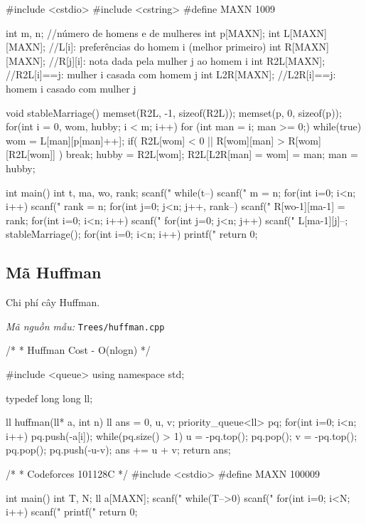 \documentclass[11pt]{article}
\newcommand{\codepath}[1]{\par\noindent\textit{Mã nguồn mẫu:} \texttt{#1}\par}
\begin{document}
\begingroup\scriptsize
\begin{vncode}
#include <cstdio>
#include <cstring>
#define MAXN 1009

int m, n;     //número de homens e de mulheres
int p[MAXN];
int L[MAXN][MAXN];    //L[i]: preferências do homem i (melhor primeiro)
int R[MAXN][MAXN];    //R[j][i]: nota dada pela mulher j ao homem i
int R2L[MAXN];  //R2L[i]==j: mulher i casada com homem j 
int L2R[MAXN];  //L2R[i]==j: homem i casado com mulher j 

void stableMarriage() {
    memset(R2L, -1, sizeof(R2L));
    memset(p, 0, sizeof(p));
    for(int i = 0, wom, hubby; i < m; i++) {
        for (int man = i; man >= 0;) {
            while(true) {
                wom = L[man][p[man]++];
                if( R2L[wom] < 0 || R[wom][man] > R[wom][R2L[wom]] ) break;
            }
            hubby = R2L[wom];
            R2L[L2R[man] = wom] = man;
            man = hubby;
        }
    }
}

int main() {
    int t, ma, wo, rank;
    scanf("%
    while(t--) {
        scanf("%
        m = n;
        for(int i=0; i<n; i++) {
            scanf("%
            rank = n;
            for(int j=0; j<n; j++, rank--) {
                scanf("%
                R[wo-1][ma-1] = rank;
            }
        }
        for(int i=0; i<n; i++) {
            scanf("%
            for(int j=0; j<n; j++) {
                scanf("%
                L[ma-1][j]--;
            }
        }
        stableMarriage();
        for(int i=0; i<n; i++) {
            printf("%
        }
    }
    return 0;
}
\end{vncode}
\endgroup


\subsection{Mã Huffman}

Chi phí cây Huffman.

\codepath{Trees/huffman.cpp}

\begingroup\scriptsize
\begin{vncode}
/*
 * Huffman Cost - O(nlogn)
 */

#include <queue>
using namespace std;

typedef long long ll;

ll huffman(ll* a, int n) {
	ll ans = 0, u, v;
	priority_queue<ll> pq;
	for(int i=0; i<n; i++) pq.push(-a[i]);
	while(pq.size() > 1) {
		u = -pq.top(); pq.pop();
		v = -pq.top(); pq.pop();
		pq.push(-u-v);
		ans += u + v;
	}
	return ans;
}

/*
 * Codeforces 101128C
 */
#include <cstdio>
#define MAXN 100009

int main() {
	int T, N;
	ll a[MAXN];
	scanf("%
	while(T-->0) {
		scanf("%
		for(int i=0; i<N; i++) scanf("%
		printf("%
	}
	return 0;
}
\end{vncode}
\endgroup
\end{document}
